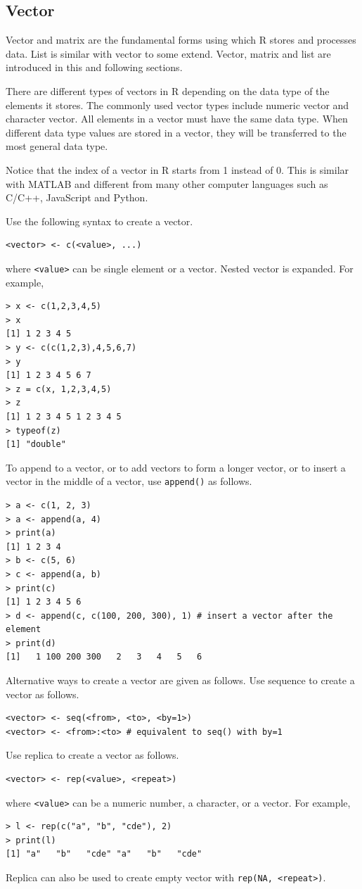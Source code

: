 \subsection{Vector}

Vector and matrix are the fundamental forms using which R stores and processes data. List is similar with vector to some extend. Vector, matrix and list are introduced in this and following sections.

There are different types of vectors in R depending on the data type of the elements it stores. The commonly used vector types include numeric vector and character vector. All elements in a vector must have the same data type. When different data type values are stored in a vector, they will be transferred to the most general data type.

Notice that the index of a vector in R starts from 1 instead of 0. This is similar with MATLAB and different from many other computer languages such as C/C++, JavaScript and Python.

Use the following syntax to create a vector.
\begin{lstlisting}
<vector> <- c(<value>, ...)
\end{lstlisting}
where \verb|<value>| can be single element or a vector. Nested vector is expanded. For example,
\begin{lstlisting}
> x <- c(1,2,3,4,5)
> x
[1] 1 2 3 4 5
> y <- c(c(1,2,3),4,5,6,7)
> y
[1] 1 2 3 4 5 6 7
> z = c(x, 1,2,3,4,5)
> z
[1] 1 2 3 4 5 1 2 3 4 5
> typeof(z)
[1] "double"
\end{lstlisting}

To append to a vector, or to add vectors to form a longer vector, or to insert a vector in the middle of a vector, use \verb|append()| as follows.
\begin{lstlisting}
> a <- c(1, 2, 3)
> a <- append(a, 4)
> print(a)
[1] 1 2 3 4
> b <- c(5, 6)
> c <- append(a, b)
> print(c)
[1] 1 2 3 4 5 6
> d <- append(c, c(100, 200, 300), 1) # insert a vector after the element
> print(d)
[1]   1 100 200 300   2   3   4   5   6
\end{lstlisting}

Alternative ways to create a vector are given as follows. Use sequence to create a vector as follows.
\begin{lstlisting}
<vector> <- seq(<from>, <to>, <by=1>)
<vector> <- <from>:<to> # equivalent to seq() with by=1
\end{lstlisting}
Use replica to create a vector as follows.
\begin{lstlisting}
<vector> <- rep(<value>, <repeat>)
\end{lstlisting}
where \verb|<value>| can be a numeric number, a character, or a vector. For example,
\begin{lstlisting}
> l <- rep(c("a", "b", "cde"), 2)
> print(l)
[1] "a"   "b"   "cde" "a"   "b"   "cde"
\end{lstlisting}
Replica can also be used to create empty vector with \verb|rep(NA, <repeat>)|.

